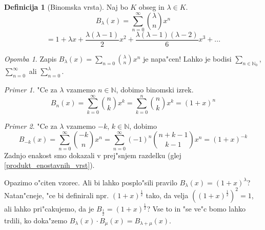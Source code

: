 \documentclass[a4paper,12pt]{article}
\theoremstyle{definition}
\newtheorem{defn}[counter]{Definicija}
\theoremstyle{remark}
\newtheorem*{ex}{Primer}
\newtheorem*{rem}{Opomba}
\newcommand{\N}{\mathbb{N}}
\begin{document}
\begin{defn}[Binomska vrsta]
	Naj bo $K$ obseg in $\lambda \in K$.
	\[B_{\lambda} (x) = \sum_{n = 0}^{\infty} \binom{\lambda}{n} x^n\]
	\[= 1 + \lambda x + \frac{\lambda (\lambda - 1)}{2} x^2 + \frac{\lambda (\lambda - 1) (\lambda - 2)}{6} x^3 + ...\]
\end{defn}

\begin{rem}
	Zapis $B_{\lambda}(x)=\sum_{n = 0} \binom{\lambda}{n} x^n$ je napa"cen! Lahko je bodisi $\sum_{n \in \N_0}$, $\sum_{n = 0}^{\infty}$ ali $\sum_{n = 0}^{\lambda}$.
\end{rem}

\begin{ex}
	"Ce za $\lambda$ vzamemo $n \in \N$, dobimo binomski izrek.
	\[B_n (x) = \sum_{k = 0}^{\infty} \binom{n}{k} x^k = \sum_{k = 0}^n \binom{n}{k} x^k = (1 + x)^n\]
\end{ex}

\begin{ex}
	"Ce za $\lambda$ vzamemo $-k$, $k \in \N$, dobimo
	\[B_{-k} (x) = \sum_{n = 0}^{\infty} \binom{-k}{n} x^n = \sum_{n = 0}^{\infty} (-1)^n \binom{n + k - 1}{k - 1} x^n = (1 + x)^{-k}\]
	Zadnjo enakost smo dokazali v prej"snjem razdelku (glej \ref{produkt_enostavnih_vrst}).
\end{ex}

Opazimo o"citen vzorec. Ali bi lahko posplo"sili pravilo $B_{\lambda}(x) = (1 + x)^{\lambda}$? Natan"cneje, "ce bi definirali npr. $(1 + x)^{\frac{1}{2}}$ tako, da velja $((1 + x)^{\frac{1}{2}})^2 = 1$, ali lahko pri"cakujemo, da je $B_{\frac{1}{2}} = (1+x)^{\frac{1}{2}}$? Vse to in "se ve"c bomo lahko trdili, ko doka"zemo $B_{\lambda} (x) \cdot B_{\mu} (x) = B_{\lambda + \mu} (x)$.
\label{TODO: kaj ce bi to dejansko tud dokazal?}
\end{document}
